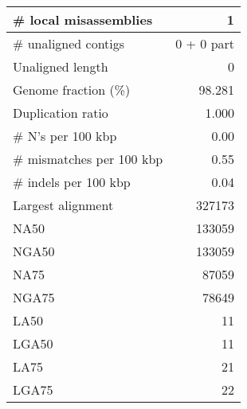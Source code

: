 \documentclass[12pt,a4paper]{article}
\begin{document}
\begin{table}[ht]
\begin{center}
\begin{tabular}{|l*{1}{|r}|}
\# local misassemblies & 1 \\ \hline
\# unaligned contigs & 0 + 0 part \\ \hline
Unaligned length & 0 \\ \hline
Genome fraction (\%) & 98.281 \\ \hline
Duplication ratio & 1.000 \\ \hline
\# N's per 100 kbp & 0.00 \\ \hline
\# mismatches per 100 kbp & 0.55 \\ \hline
\# indels per 100 kbp & 0.04 \\ \hline
Largest alignment & 327173 \\ \hline
NA50 & 133059 \\ \hline
NGA50 & 133059 \\ \hline
NA75 & 87059 \\ \hline
NGA75 & 78649 \\ \hline
LA50 & 11 \\ \hline
LGA50 & 11 \\ \hline
LA75 & 21 \\ \hline
LGA75 & 22 \\ \hline
\end{tabular}
\end{center}
\end{table}
\end{document}
